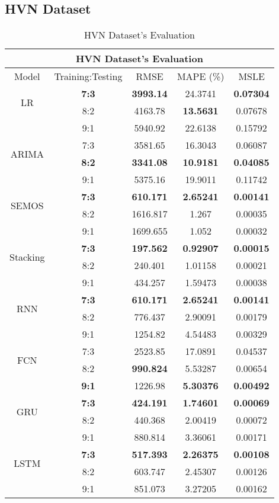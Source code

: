 \documentclass{ieeeojies}
\begin{document}
\subsection{HVN Dataset} 
\begin{table}[H]
    \centering
    \begin{tabular}{|c|c|c|c|c|}
         \hline
         \multicolumn{5}{|c|}{\textbf{HVN Dataset's Evaluation}}\\
         \hline
         \centering Model & Training:Testing & RMSE & MAPE (\%) & MSLE\\
         \hline
         \multirow{2}{*}{LR} & \textbf{7:3} & \textbf{3993.14} & 24.3741 & \textbf{0.07304} \\ & 8:2 & 4163.78 & \textbf{13.5631} & 0.07678 \\ & 9:1 & 5940.92 & 22.6138 & 0.15792\\
         \hline
         \multirow{2}{*}{ARIMA} & 7:3&3581.65&16.3043&0.06087\\ & \textbf{8:2}&\textbf{3341.08}&\textbf{10.9181}&\textbf{0.04085} \\ & 9:1 & 5375.16 & 19.9011 &0.11742\\
         \hline
         \multirow{2}{*}{SEMOS} & \textbf{7:3}	& \textbf{610.171} & \textbf{2.65241} & \textbf{0.00141} \\ & 8:2 & 1616.817 & 1.267 & 0.00035 \\ & 9:1 & 1699.655  & 1.052 & 0.00032\\
         \hline
         \multirow{2}{*}{Stacking} & \textbf{7:3} &  \textbf{197.562} & \textbf{0.92907} & \textbf{0.00015} \\ & 8:2 & 240.401 & 1.01158 & 0.00021 \\ & 9:1 & 434.257  & 1.59473 & 0.00038\\
         \hline
         \multirow{2}{*}{RNN} & \textbf{7:3}	& \textbf{610.171} & \textbf{2.65241} & \textbf{0.00141} \\ & 8:2 & 776.437 & 2.90091 & 0.00179 \\ & 9:1 & 1254.82  & 4.54483 & 0.00329\\
         \hline
         \multirow{2}{*}{FCN} & 7:3 & 2523.85 & 17.0891 & 0.04537 \\ & 8:2 &	\textbf{990.824} & 5.53287 & 0.00654 \\ & \textbf{9:1} & 1226.98	& \textbf{5.30376} & \textbf{0.00492}\\
         \hline
         \multirow{2}{*}{GRU} & \textbf{7:3} & \textbf{424.191} & \textbf{1.74601} & \textbf{0.00069} \\ & 8:2 & 440.368 & 2.00419 & 0.00072 \\ & 9:1 &  880.814 & 3.36061 & 0.00171 \\
         \hline
         \multirow{2}{*}{LSTM} & \textbf{7:3} & \textbf{517.393} &  \textbf{2.26375} &  \textbf{0.00108} \\ & 8:2 & 603.747 &  2.45307 &  0.00126 \\ & 9:1 & 851.073 & 3.27205 & 0.00162\\
         \hline
    \end{tabular}
    \caption{HVN Dataset's Evaluation}
    \label{vcbresult}
\end{table}
\end{document}
